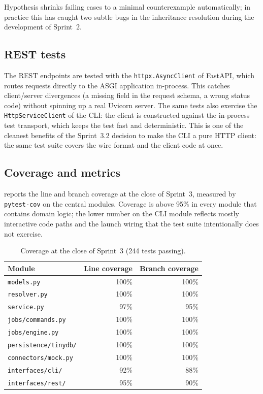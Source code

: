 Hypothesis shrinks failing cases to a minimal counterexample
automatically; in practice this has caught two subtle bugs in
the inheritance resolution during the development of Sprint~2.

\subsection{REST tests}

The REST endpoints are tested with the \texttt{httpx.AsyncClient}
of FastAPI, which routes requests directly to the ASGI application
in-process. This catches client/server divergences (a missing field
in the request schema, a wrong status code) without spinning up a
real Uvicorn server. The same tests also exercise the
\texttt{HttpServiceClient} of the CLI: the client is constructed
against the in-process test transport, which keeps the test fast
and deterministic. This is one of the cleanest benefits of the
Sprint~3.2 decision to make the CLI a pure HTTP client: the same
test suite covers the wire format and the client code at once.

\subsection{Coverage and metrics}

 reports the line and branch coverage at the
close of Sprint~3, measured by \texttt{pytest-cov} on the central
modules. Coverage is above 95\% in every module that contains
domain logic; the lower number on the CLI module reflects mostly
interactive code paths and the launch wiring that the test suite
intentionally does not exercise.

\begin{table}[ht]
  \centering
  \small
  \begin{tabular}{l r r}
    \toprule
    \textbf{Module} & \textbf{Line coverage} & \textbf{Branch coverage} \\
    \midrule
    \texttt{models.py}            & 100\% & 100\% \\
    \texttt{resolver.py}          & 100\% & 100\% \\
    \texttt{service.py}           & 97\%  & 95\% \\
    \texttt{jobs/commands.py}     & 100\% & 100\% \\
    \texttt{jobs/engine.py}       & 100\% & 100\% \\
    \texttt{persistence/tinydb/}  & 100\% & 100\% \\
    \texttt{connectors/mock.py}   & 100\% & 100\% \\
    \texttt{interfaces/cli/}      & 92\%  & 88\% \\
    \texttt{interfaces/rest/}     & 95\%  & 90\% \\
    \bottomrule
  \end{tabular}
  \caption{Coverage at the close of Sprint~3 (244 tests passing).}
  \label{tab:coverage}
\end{table}


